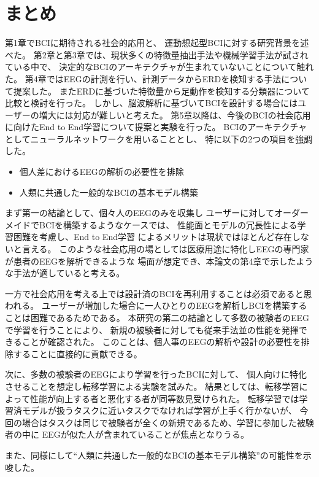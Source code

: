 \section{\mc まとめ}
第1章でBCIに期待される社会的応用と、
運動想起型BCIに対する研究背景を述べた。
第2章と第3章では、現状多くの特徴量抽出手法や機械学習手法が試されている中で、
決定的なBCIのアーキテクチャが生まれていないことについて触れた。
第4章ではEEGの計測を行い、計測データからERDを検知する手法について提案した。
またERDに基づいた特徴量から足動作を検知する分類器について比較と検討を行った。
しかし、脳波解析に基づいてBCIを設計する場合にはユーザーの増大には対応が難しいと考えた。
第5章以降は、今後のBCIの社会応用に向けたEnd to End学習について提案と実験を行った。
BCIのアーキテクチャとしてニューラルネットワークを用いることとし、
特に以下の2つの項目を強調した。
\begin{itemize}
    \item 個人差におけるEEGの解析の必要性を排除
    \item 人類に共通した一般的なBCIの基本モデル構築
\end{itemize}
まず第一の結論として、個々人のEEGのみを収集し
ユーザーに対してオーダーメイドでBCIを構築するようなケースでは、
性能面とモデルの冗長性による学習困難を考慮し、End to End学習
によるメリットは現状ではほとんど存在しないと言える。
このような社会応用の場としては医療用途に特化しEEGの専門家が患者のEEGを解析できるような
場面が想定でき、本論文の第4章で示したような手法が適していると考える。

一方で社会応用を考える上では設計済のBCIを再利用することは必須であると思われる。
ユーザーが増加した場合に一人ひとりのEEGを解析しBCIを構築することは困難であるためである。
本研究の第二の結論として多数の被験者のEEGで学習を行うことにより、
新規の被験者に対しても従来手法並の性能を発揮できることが確認された。
このことは、個人事のEEGの解析や設計の必要性を排除することに直接的に貢献できる。

次に、多数の被験者のEEGにより学習を行ったBCIに対して、
個人向けに特化させることを想定し転移学習による実験を試みた。
結果としては、転移学習によって性能が向上する者と悪化する者が同等数見受けられた。
転移学習では学習済モデルが扱うタスクに近いタスクでなければ学習が上手く行かないが、
今回の場合はタスクは同じで被験者が全くの新規であるため、学習に参加した被験者の中に
EEGが似た人が含まれていることが焦点となりうる。


また、同様にして``人類に共通した一般的なBCIの基本モデル構築''の可能性を示唆した。


